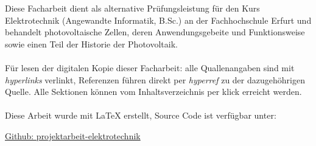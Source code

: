 Diese Facharbeit dient als alternative Prüfungsleistung für den
Kurs Elektrotechnik (Angewandte Informatik, B.Sc.) an der
Fachhochschule Erfurt und behandelt photovoltaische Zellen, deren
Anwendungsgebeite und Funktionsweise sowie einen Teil der
Historie der Photovoltaik.
\\\\
Für lesen der digitalen Kopie dieser Facharbeit: alle
Quallenangaben sind mit \textit{hyperlinks} verlinkt, Referenzen
führen direkt per \textit{hyperref} zu der dazugehöhrigen Quelle.
Alle Sektionen können vom Inhaltsverzeichnis per klick erreicht
werden.
\\\\
Diese Arbeit wurde mit \LaTeX{} erstellt, Source Code ist verfügbar unter:
\begin{center}
    \href{https://github.com/erxkk/projektarbeit-elektrotechnik}
    {Github: projektarbeit-elektrotechnik}
\end{center}